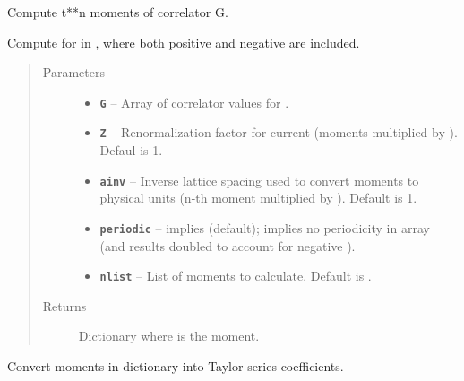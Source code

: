 \documentclass[letterpaper,10pt,english]{sphinxmanual}
\begin{document}
\begin{fulllineitems}
\label{g2tools:g2tools.moments}
Compute t**n moments of correlator G.

Compute  for  in , where both positive and
negative  are included.
\begin{quote}\begin{description}
\item[{Parameters}] \leavevmode\begin{itemize}
\item {} 
\textbf{\texttt{G}} -- Array of correlator values  for .

\item {} 
\textbf{\texttt{Z}} -- Renormalization factor for current (moments multiplied by ).
Defaul is 1.

\item {} 
\textbf{\texttt{ainv}} -- Inverse lattice spacing used to convert moments to
physical units (n-th moment multiplied by ).
Default is 1.

\item {} 
\textbf{\texttt{periodic}} --  implies  (default);
 implies no periodicity in array 
(and results doubled to account for negative ).

\item {} 
\textbf{\texttt{nlist}} -- List of moments to calculate. Default is
.

\end{itemize}

\item[{Returns}] \leavevmode
Dictionary  where  is the  moment.

\end{description}\end{quote}

\end{fulllineitems}


\begin{fulllineitems}
\label{g2tools:g2tools.mom2taylor}
Convert moments in dictionary  into Taylor series coefficients.

\end{fulllineitems}
\end{document}
